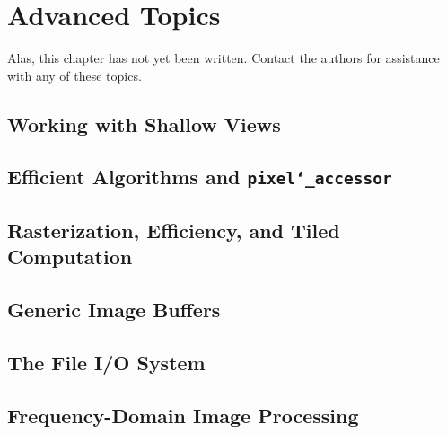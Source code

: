 \chapter{Advanced Topics}\label{ch:advanced-topics}

Alas, this chapter has not yet been written.  Contact the 
authors for assistance with any of these topics.

\section{Working with Shallow Views}\label{sec:advanced.shallow}

\section{Efficient Algorithms and {\tt pixel\char`\_accessor}}

\section{Rasterization, Efficiency, and Tiled Computation}

\section{Generic Image Buffers}\label{sec:advanced.generic}

\section{The File I/O System}\label{sec:advanced.fileio}

\section{Frequency-Domain Image Processing}\label{sec:advanced.frequency}

